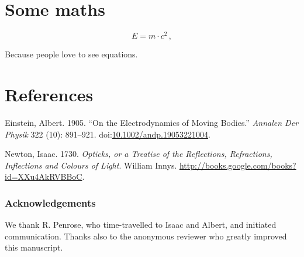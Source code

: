 \documentclass[A4paper,]{article}
\begin{document}
\section{Some maths}\label{some-maths}

\begin{equation} E = m\cdot c^2\,, \label{eq:emc2}\end{equation}

Because people love to see equations.

\section*{References}\label{references}

\hypertarget{refs}{}
\hypertarget{ref-Einstein1905}{}
Einstein, Albert. 1905. ``On the Electrodynamics of Moving Bodies.'' \emph{Annalen Der Physik} 322 (10): 891--921. doi:\href{https://doi.org/10.1002/andp.19053221004}{10.1002/andp.19053221004}.

\hypertarget{ref-Newton1730}{}
Newton, Isaac. 1730. \emph{Opticks, or a Treatise of the Reflections, Refractions, Inflections and Colours of Light}. William Innys. \url{http://books.google.com/books?id=XXu4AkRVBBoC}.

\subsubsection*{Acknowledgements}
{\small We thank R. Penrose, who time-travelled to Isaac and Albert, and initiated communication.
Thanks also to the anonymous reviewer who greatly improved this manuscript.}
\end{document}
